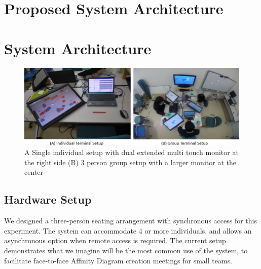 \documentclass{sigchi}
\begin{document}
\section{Proposed System Architecture}


\section{System Architecture}
\begin{figure}
\centering
\includegraphics[width=1.9\columnwidth]{system}
\caption{{A} Single individual setup with dual extended multi touch monitor at the right side (B) 3 person group setup with a larger monitor at the center}
\label{fig:figure1}
\end{figure}

\subsection{Hardware Setup}


We designed a three-person seating arrangement with synchronous access for this experiment. The system can accommodate 4 or more individuals, and allows an asynchronous option when remote access is required. The current setup demonstrates what we imagine will be the most common use of the system, to facilitate face-to-face Affinity Diagram creation meetings for small teams. 
\end{document}
